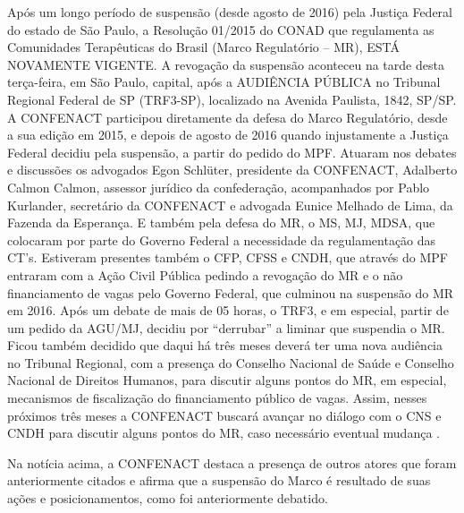 \documentclass[
	12pt,				%
	oneside,			%
	a4paper,			%
	sumario=tradicional,
	english,			%
	brazil				%
	]{abntex2}
\begin{document}
\begin{quoting}[rightmargin=0cm,leftmargin=4cm]
\begin{singlespace}
{\footnotesize
Após um longo período de suspensão (desde agosto de 2016) pela Justiça Federal do estado de São Paulo, a Resolução 01/2015 do CONAD que regulamenta as Comunidades Terapêuticas do Brasil (Marco Regulatório – MR), ESTÁ NOVAMENTE VIGENTE. A revogação da suspensão aconteceu na tarde desta terça-feira, em São Paulo, capital, após a AUDIÊNCIA PÚBLICA no Tribunal Regional Federal de SP (TRF3-SP), localizado na Avenida Paulista, 1842, SP/SP. A CONFENACT participou diretamente da defesa do Marco Regulatório, desde a sua edição em 2015, e depois de agosto de 2016 quando injustamente a Justiça Federal decidiu pela suspensão, a partir do pedido do MPF. Atuaram nos debates e discussões os advogados Egon Schlüter, presidente da CONFENACT, Adalberto Calmon Calmon, assessor jurídico da confederação, acompanhados por Pablo Kurlander, secretário da CONFENACT e advogada Eunice Melhado de Lima, da Fazenda da Esperança. E também pela defesa do MR, o MS, MJ, MDSA, que colocaram por parte do Governo Federal a necessidade da regulamentação das CT’s. Estiveram presentes também o CFP, CFSS e CNDH, que através do MPF entraram com a Ação Civil Pública pedindo a revogação do MR e o não financiamento de vagas pelo Governo Federal, que culminou na suspensão do MR em 2016. Após um debate de mais de 05 horas, o TRF3, e em especial, partir de um pedido da AGU/MJ, decidiu por “derrubar” a liminar que suspendia o MR. Ficou também decidido que daqui há três meses deverá ter uma nova audiência no Tribunal Regional, com a presença do Conselho Nacional de Saúde e Conselho Nacional de Direitos Humanos, para discutir alguns pontos do MR, em especial, mecanismos de fiscalização do financiamento público de vagas. Assim, nesses próximos três meses a CONFENACT buscará avançar no diálogo com o CNS e CNDH para discutir alguns pontos do MR, caso necessário eventual mudança \cite{confenact2018}.}

\end{singlespace}
\end{quoting}
Na notícia acima, a CONFENACT destaca a presença de outros atores que foram anteriormente citados e afirma que a suspensão do Marco é resultado de suas ações e posicionamentos, como foi anteriormente debatido.
\end{document}
